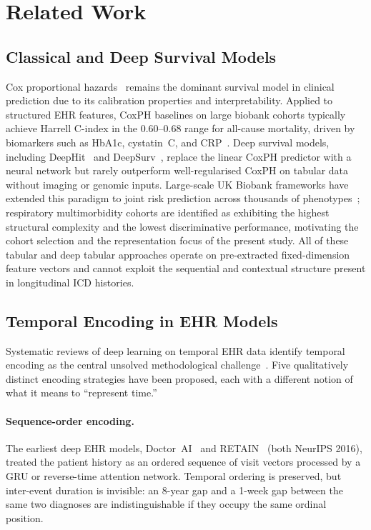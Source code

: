 \section{Related Work}

\subsection{Classical and Deep Survival Models}
Cox proportional hazards~\cite{coxph_original} remains the dominant survival model in clinical
prediction due to its calibration properties and interpretability.
Applied to structured EHR features, CoxPH baselines on large biobank cohorts typically achieve
Harrell C-index in the 0.60--0.68 range for all-cause mortality, driven by biomarkers such as
HbA1c, cystatin~C, and CRP~\cite{harrellcindex}.
Deep survival models, including DeepHit~\cite{deephit} and DeepSurv~\cite{deepsurv}, replace
the linear CoxPH predictor with a neural network but rarely outperform well-regularised CoxPH
on tabular data without imaging or genomic inputs.
Large-scale UK Biobank frameworks have extended this paradigm to joint risk prediction across
thousands of phenotypes~\cite{ukbmdrmf}; respiratory multimorbidity cohorts are identified
as exhibiting the highest structural complexity and the lowest discriminative performance,
motivating the cohort selection and the representation focus of the present study.
All of these tabular and deep tabular approaches operate on pre-extracted fixed-dimension
feature vectors and cannot exploit the sequential and contextual structure present in
longitudinal ICD histories.

\subsection{Temporal Encoding in EHR Models}
Systematic reviews of deep learning on temporal EHR data identify temporal encoding as the
central unsolved methodological challenge~\cite{xie2022temporal}.
Five qualitatively distinct encoding strategies have been proposed, each with a different
notion of what it means to ``represent time.''

\paragraph{Sequence-order encoding.}
The earliest deep EHR models, Doctor~AI~\cite{doctorai} and RETAIN~\cite{retain} (both
NeurIPS 2016), treated the patient history as an ordered sequence of visit vectors processed
by a GRU or reverse-time attention network.
Temporal ordering is preserved, but inter-event duration is invisible: an 8-year gap and
a 1-week gap between the same two diagnoses are indistinguishable if they occupy the same
ordinal position.

